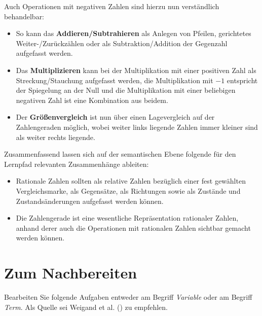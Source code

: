 \documentclass[
]{scrbook}
\providecommand{\tightlist}{%
  \setlength{\itemsep}{0pt}\setlength{\parskip}{0pt}}
\theoremstyle{definition}
\theoremstyle{definition}
\theoremstyle{definition}
\theoremstyle{definition}
\theoremstyle{remark}
\begin{document}
Auch Operationen mit negativen Zahlen sind hierzu nun verständlich behandelbar:

\begin{itemize}
\tightlist
\item
  So kann das \textbf{Addieren/Subtrahieren} als Anlegen von Pfeilen, gerichtetes Weiter-/Zurückzählen oder als Subtraktion/Addition der Gegenzahl aufgefasst werden.
\item
  Das \textbf{Multiplizieren} kann bei der Multiplikation mit einer positiven Zahl als Streckung/Stauchung aufgefasst werden, die Multiplikation mit \(-1\) entspricht der Spiegelung an der Null und die Multiplikation mit einer beliebigen negativen Zahl ist eine Kombination aus beidem.
\item
  Der \textbf{Größenvergleich} ist nun über einen Lagevergleich auf der Zahlengeraden möglich, wobei weiter links liegende Zahlen immer kleiner sind als weiter rechts liegende.
\end{itemize}

Zusammenfassend lassen sich auf der semantischen Ebene folgende für den Lernpfad relevanten Zusammenhänge ableiten:

\begin{itemize}
\tightlist
\item
  \textcolor{semanticColor}{Rationale Zahlen sollten als relative Zahlen bezüglich einer fest gewählten Vergleichsmarke, als Gegensätze, als Richtungen sowie als Zustände und Zustandsänderungen aufgefasst werden können.}
\item
  \textcolor{semanticColor}{Die Zahlengerade ist eine wesentliche Repräsentation rationaler Zahlen, anhand derer auch die Operationen mit rationalen Zahlen sichtbar gemacht werden können.}
\end{itemize}

\section{Zum Nachbereiten}\label{grundvorstellungen-nachbereitung}

Bearbeiten Sie folgende Aufgaben entweder am Begriff \emph{Variable} oder am Begriff \emph{Term}. Als Quelle sei Weigand et al. () zu empfehlen.
\end{document}

